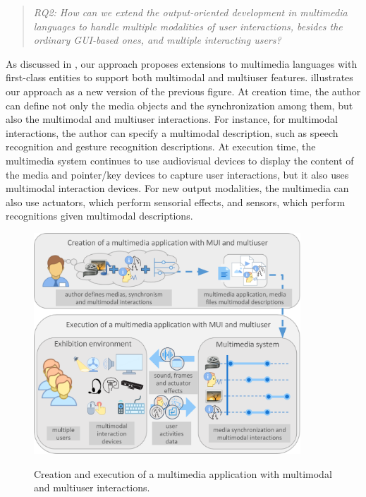 \begin{quote}
	\textit{RQ2: How can we extend the output-oriented development in multimedia
	languages to handle multiple modalities of user interactions, besides the
	ordinary GUI-based ones, and multiple interacting users?}
\end{quote}

As discussed in , our approach proposes extensions to
multimedia languages with first-class entities to support both multimodal and
multiuser features.  illustrates our approach as a
new version of the previous figure. At creation time, the author can define not
only the media objects and the synchronization among them, but also the
multimodal and multiuser interactions. For instance, for multimodal
interactions, the author can specify a multimodal description, such as speech
recognition and gesture recognition descriptions. At execution time, the
multimedia system continues to use audiovisual devices to display the content of
the media and pointer/key devices to capture user interactions, but it also uses
multimodal interaction devices. For new output modalities, the multimedia can
also use actuators, which perform sensorial effects, and sensors, which perform
recognitions given multimodal descriptions.

\begin{figure}[!ht]
\begin{center}
	\includegraphics[width=10cm, keepaspectratio]{img/img5.png}
	\caption{Creation and execution of a multimedia application with multimodal
	and multiuser interactions.}
    \captionvspace
	\label{fig:overview-multimodal}
\end{center}
\end{figure}


